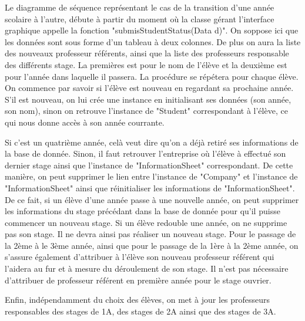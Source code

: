\documentclass{scrreprt}
\begin{document}
	Le diagramme de séquence représentant le cas de la transition d'une année scolaire à l'autre, débute à partir du moment
où la classe gérant l'interface graphique appelle la fonction "submisStudentStatus(Data d)". On soppose ici que les données
sont sous forme d'un tableau à deux colonnes. De plus on aura la liste des nouveaux professeur référents, ainsi que la liste des professeurs
responsable des différents stage. La premières est pour le nom de l'élève et la deuxième est pour l'année dans laquelle
il passera. La procédure se répétera pour chaque élève. On commence par savoir si l'élève est nouveau en regardant sa prochaine année.
S'il est nouveau, on lui crée une instance en initialisant ses données (son année, son nom), sinon on retrouve l'instance de "Student" 
correspondant à l'élève, ce qui nous donne accès à son année courrante. 

	Si c'est un quatrième année, celà veut dire qu'on a déjà retiré ses informations de la base de donnée. Sinon, il faut retrouver 
l'entreprise où l'élève à effectué son dernier stage ainsi que l'instance de "InformationSheet" correspondant. De cette manière, on peut 
supprimer le lien entre l'instance de "Company" et l'instance de "InformationSheet" ainsi que réinitialiser les informations de 
"InformationSheet". De ce fait, si un élève d'une année passe à une nouvelle année, on peut supprimer les informations du stage précédant 
dans la base de donnée pour qu'il puisse commencer un nouveau stage. Si un élève redouble une année, on ne supprime pas son stage. Il ne 
devra ainsi pas réaliser un nouveau stage. Pour le passage de la 2ème à le 3ème année, ainsi que pour le passage de la 1ère à la 2ème année, 
on s'assure également d'attribuer à l'élève son nouveau professeur référent qui l'aidera au fur et à mesure du déroulement de son stage. 
Il n'est pas nécessaire d'attribuer de professeur référent en première année pour le stage ouvrier. 

	Enfin, indépendamment du choix des élèves, on met à jour les professeurs responsables des stages de 1A, des stages de 2A ainsi que 
des stages de 3A.  
\end{document}
